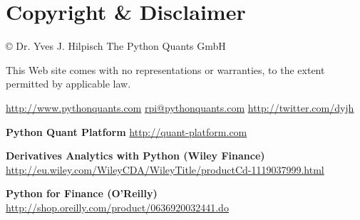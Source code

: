 \documentclass[letterpaper,10pt,english]{sphinxmanual}
\begin{document}
\chapter{Copyright \& Disclaimer}
\label{index:copyright-disclaimer}
© Dr. Yves J. Hilpisch \textbar{} The Python Quants GmbH

This Web site comes with no representations or warranties, to the extent
permitted by applicable law.

\href{http://www.pythonquants.com}{http://www.pythonquants.com} \textbar{} \href{mailto:rpi@pythonquants.com}{rpi@pythonquants.com} \textbar{}
\href{http://twitter.com/dyjh}{http://twitter.com/dyjh}

\textbf{Python Quant Platform} \textbar{} \href{http://quant-platform.com}{http://quant-platform.com}

\textbf{Derivatives Analytics with Python (Wiley Finance)} \textbar{}
\href{http://eu.wiley.com/WileyCDA/WileyTitle/productCd-1119037999.html}{http://eu.wiley.com/WileyCDA/WileyTitle/productCd-1119037999.html}

\textbf{Python for Finance (O'Reilly)} \textbar{}
\href{http://shop.oreilly.com/product/0636920032441.do}{http://shop.oreilly.com/product/0636920032441.do}



\renewcommand{\indexname}{Index}
\printindex
\end{document}
